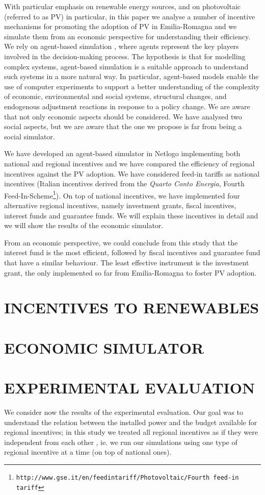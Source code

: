 \documentclass [twocolumn,a4paper,10pt]{ECMS}
\newcommand{\Section}[1]{\section*{#1}\vspace*{-0.7em}}
\begin{document}
With particular emphasis on renewable energy sources, and on photovoltaic (referred to as PV) in particular, in this paper we analyse a number of incentive mechanisms for promoting the adoption of PV in Emilia-Romagna and we simulate them from an economic perspective
for understanding their efficiency. We rely on agent-based simulation \citep{DBLP:journals/jasss/TroitzschMGD99,Matthews2007,GilbertBook}, where agents represent the key players involved in the decision-making process. The hypothesis is that for modelling complex systems, agent-based  simulation is a suitable approach to understand such systems in a more natural way. In particular, agent-based models enable the use of computer experiments to support a better understanding of the complexity of  economic, environmental and social systems, structural changes, and endogenous adjustment reactions in response to a policy change.
We are aware that not only economic aspects should be considered. We have analysed two social aspects, but we are aware that the one we propose is far from being a social simulator. 

We have developed an agent-based simulator in Netlogo \citep{netlogo} implementing both national and regional incentives and we have compared the efficiency of regional incentives against the PV adoption. We have considered feed-in tariffs as national incentives (Italian incentives derived from the {\em Quarto Conto Energia}, Fourth Feed-In-Scheme\footnote{\tt{http://www.gse.it/en/feedintariff/Photovoltaic/Fourth feed-in tariff}}). 
On top of national incentives, we have implemented four alternative regional incentives, namely investment grants, fiscal incentives, interest funds and guarantee funds. We will explain these incentives in detail and we will show the results of the economic simulator.  

From an economic perspective, we could conclude from this study that the interest fund is the most efficient, followed by fiscal incentives and guarantee fund that have a similar behaviour. The least effective instrument is the investment grant, the only implemented so far from Emilia-Romagna to foster PV adoption.

\Section{INCENTIVES TO RENEWABLES}
\label{incentives}

\Section{ECONOMIC SIMULATOR}

\Section{EXPERIMENTAL EVALUATION}
We consider now the results of the experimental evaluation. Our goal was to understand the relation between the installed power and the budget available for regional incentives; in this study we treated all regional incentives as if they were independent from each other , ie. we run our simulations using one type of regional incentive at a time (on top of national ones). 
\end{document}
